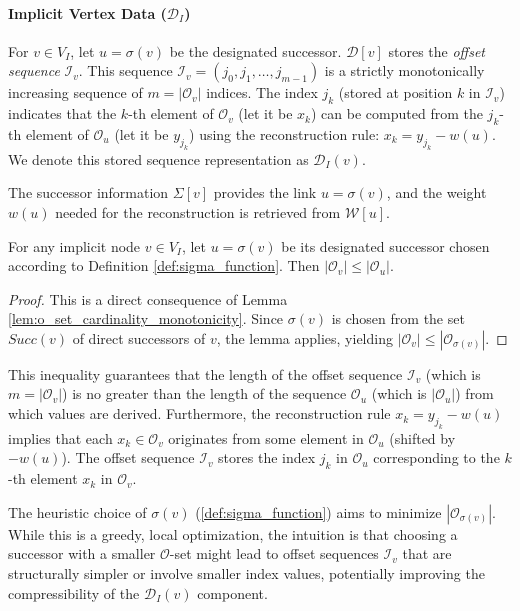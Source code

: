 \paragraph{Implicit Vertex Data ($\mathcal{D}_I$)}
For $v \in V_I$, let $u = \sigma(v)$ be the designated successor. $\mathcal{D}[v]$ stores the \emph{offset sequence} $\mathcal{I}_v$. This sequence $\mathcal{I}_v = (j_0, j_1, \dots, j_{m-1})$ is a strictly monotonically increasing sequence of $m = |\mathcal{O}_v|$ indices. The index $j_k$ (stored at position $k$ in $\mathcal{I}_v$) indicates that the $k$-th element of $\mathcal{O}_v$ (let it be $x_k$) can be computed from the $j_k$-th element of $\mathcal{O}_u$ (let it be $y_{j_k}$) using the reconstruction rule: $x_k = y_{j_k} - w(u)$. We denote this stored sequence representation as $\mathcal{D}_I(v)$.

The successor information $\Sigma[v]$ provides the link $u = \sigma(v)$, and the weight $w(u)$ needed for the reconstruction is retrieved from $\mathcal{W}[u]$.

\begin{proposition}
    \label{prop:o_set_size_guarantee}
    For any implicit node $v \in V_I$, let $u = \sigma(v)$ be its designated successor chosen according to Definition \ref{def:sigma_function}. Then $|\mathcal{O}_v| \le |\mathcal{O}_u|$.
\end{proposition}
\begin{proof}
    This is a direct consequence of Lemma \ref{lem:o_set_cardinality_monotonicity}. Since $\sigma(v)$ is chosen from the set $Succ(v)$ of direct successors of $v$, the lemma applies, yielding $|\mathcal{O}_v| \le |\mathcal{O}_{\sigma(v)}|$.
\end{proof}
This inequality guarantees that the length of the offset sequence $\mathcal{I}_v$ (which is $m = |\mathcal{O}_v|$) is no greater than the length of the sequence $\mathcal{O}_u$ (which is $|\mathcal{O}_u|$) from which values are derived. Furthermore, the reconstruction rule $x_k = y_{j_k} - w(u)$ implies that each $x_k \in \mathcal{O}_v$ originates from some element in $\mathcal{O}_u$ (shifted by $-w(u)$). The offset sequence $\mathcal{I}_v$ stores the index $j_k$ in $\mathcal{O}_u$ corresponding to the $k$-th element $x_k$ in $\mathcal{O}_v$.

The heuristic choice of $\sigma(v)$ (\ref{def:sigma_function}) aims to minimize $|\mathcal{O}_{\sigma(v)}|$. While this is a greedy, local optimization, the intuition is that choosing a successor with a smaller $\mathcal{O}$-set might lead to offset sequences $\mathcal{I}_v$ that are structurally simpler or involve smaller index values, potentially improving the compressibility of the $\mathcal{D}_I(v)$ component.

